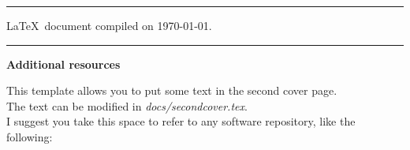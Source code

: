 \mbox{}
\vfill

{\small\onehalfspacing
\begin{center}

\noindent\rule{\textwidth}{1pt} %

    \LaTeX~document compiled on \today.

\noindent\rule{\textwidth}{.2pt} %

    \textbf{Additional resources}
    
    This template allows you to put some text in the second cover page.\\ 
    The text can be modified in \textit{docs/secondcover.tex}.\\
    I suggest you take this space to refer to any software repository, like the following:\\


\end{center}
} %